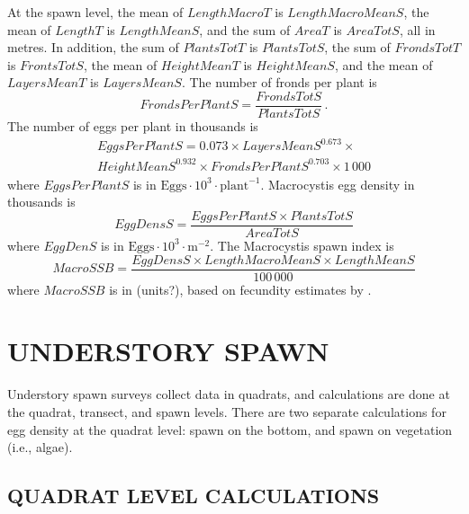 \documentclass[12pt]{article}
\begin{document}
At the spawn level, the mean of $LengthMacroT$ is $LengthMacroMeanS$, the mean of $LengthT$ is $LengthMeanS$, and the sum of $AreaT$ is $AreaTotS$, all in metres.
In addition, the sum of $PlantsTotT$ is $PlantsTotS$, the sum of $FrondsTotT$ is $FrontsTotS$, the mean of $HeightMeanT$ is $HeightMeanS$, and the mean of $LayersMeanT$ is $LayersMeanS$. 
The number of fronds per plant is
\begin{equation}
FrondsPerPlantS = \frac{FrondsTotS} {PlantsTotS} \, .
\label{eqFrondsPerPlant}
\end{equation}
The number of eggs per plant in thousands is \citep{HaegeleSchweigert1990}
\begin{multline}
EggsPerPlantS = 0.073 \times LayersMeanS^{0.673} \times \\ 
HeightMeanS^{0.932} \times FrondsPerPlantS^{0.703} \times 1\,000
\label{eqEggsPerPlantMacro}
\end{multline}
where $EggsPerPlantS$ is in $\text{Eggs} \cdot 10^{3} \cdot \text{plant}^{-1}$. 
Macrocystis egg density in thousands is
\begin{equation}
EggDensS = \frac{EggsPerPlantS \times PlantsTotS} {AreaTotS}
\label{eqEggDensityMacro}
\end{equation}
where $EggDenS$ is in $\text{Eggs} \cdot 10^{3} \cdot \text{m}^{-2}$.
The Macrocystis spawn index is
\begin{equation}
MacroSSB = \frac{EggDensS \times LengthMacroMeanS \times LengthMeanS} {100\,000}
\label{eqBiomassMacro}
\end{equation}
where $MacroSSB$ is in (units?), based on fecundity estimates by \citet{Hay1985}.

\section{UNDERSTORY SPAWN}

Understory spawn surveys collect data in quadrats, and calculations are done at the quadrat, transect, and spawn levels.
There are two separate calculations for egg density at the quadrat level: spawn on the bottom, and spawn on vegetation (i.e., algae).

\subsection{QUADRAT LEVEL CALCULATIONS}
\end{document}
